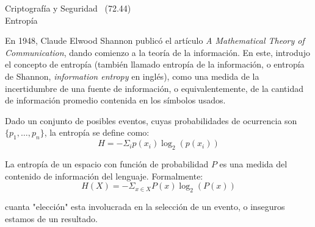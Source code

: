 \documentclass[]{book}
\theoremstyle{definition}
\begin{document}
\begin{center}
  {\Large Criptografía y Seguridad \the\year~(72.44)\\[.2cm]
Entropía}\\
\end{center}

\vspace{0.2 cm}


En 1948, Claude Elwood Shannon publicó el artículo \textit{A Mathematical
Theory of Communication}, dando comienzo a la teoría de la información. En
este, introdujo el concepto de entropía (también llamado entropía de la
información, o entropía de Shannon, \textit{information entropy} en
inglés), como una medida de la incertidumbre de una fuente de información, o
equivalentemente, de la cantidad de información promedio contenida en los
símbolos usados.

Dado un conjunto de posibles eventos, cuyas probabilidades de ocurrencia son $\{p_1,\dots,p_n\}$, la entropía se define como:
\[ H = -\Sigma_{i} p(x_i)\log_2(p(x_i))\]

La entropía de un espacio con función de probabilidad $P$ es una medida del
contenido de información del lenguaje. Formalmente:
\[ H(X) = -\Sigma_{x \in X} P(x)\log_2(P(x)) \]



cuanta "elección" esta involucrada en la
selección de un evento, o inseguros estamos de un resultado.
\end{document}
